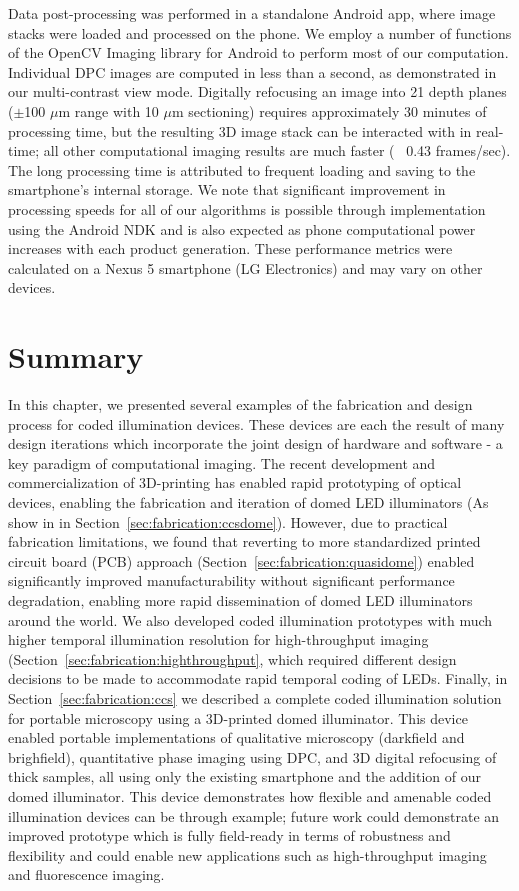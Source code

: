 Data post-processing was performed in a standalone Android app, where image stacks were loaded and processed on the phone. We employ a number of functions of the OpenCV Imaging library for Android to perform most of our computation. Individual DPC images are computed in less than a second, as demonstrated in our multi-contrast view mode. Digitally refocusing an image into 21 depth planes ($\pm$100 $\mu$m range with 10 $\mu$m sectioning) requires approximately 30 minutes of processing time, but the resulting 3D image stack can be interacted with in real-time; all other computational imaging results are much faster (~ 0.43 frames/sec). The long processing time is attributed to frequent loading and saving to the smartphone's internal storage. We note that significant improvement in processing speeds for all of our algorithms is possible through implementation using the Android NDK and is also expected as phone computational power increases with each product generation. These performance metrics were calculated on a Nexus 5 smartphone (LG Electronics) and may vary on other devices.

\section{Summary}
In this chapter, we presented several examples of the fabrication and design process for coded illumination devices. These devices are each the result of many design iterations which incorporate the joint design of hardware and software - a key paradigm of computational imaging. The recent development and commercialization of 3D-printing has enabled rapid prototyping of optical devices, enabling the fabrication and iteration of domed LED illuminators (As show in in Section~\ref{sec:fabrication:ccsdome}). However, due to practical fabrication limitations, we found that reverting to more standardized printed circuit board (PCB) approach (Section~\ref{sec:fabrication:quasidome}) enabled significantly improved manufacturability without significant performance degradation, enabling more rapid dissemination of domed LED illuminators around the world. We also developed coded illumination prototypes with much higher temporal illumination resolution for high-throughput imaging (Section~\ref{sec:fabrication:highthroughput}, which required different design decisions to be made to accommodate rapid temporal coding of LEDs. Finally, in Section~\ref{sec:fabrication:ccs} we described a complete coded illumination solution for portable microscopy using a 3D-printed domed illuminator. This device enabled portable implementations of qualitative microscopy (darkfield and brighfield), quantitative phase imaging using DPC, and 3D digital refocusing of thick samples, all using only the existing smartphone and the addition of our domed illuminator. This device demonstrates how flexible and amenable coded illumination devices can be through example; future work could demonstrate an improved prototype which is fully field-ready in terms of robustness and flexibility and could enable new applications such as high-throughput imaging and fluorescence imaging.
